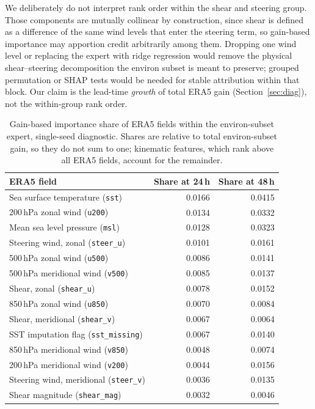 \documentclass{ametsocv6.1}
\newcommand{\era}{ERA5}
\begin{document}
We deliberately do not interpret rank order within the shear and steering group.
Those components are mutually collinear by construction, since shear is defined as
a difference of the same wind levels that enter the steering term, so gain-based
importance may apportion credit arbitrarily among them. Dropping one wind level or
replacing the expert with ridge regression would remove the physical shear--steering
decomposition the environ subset is meant to preserve; grouped permutation or SHAP
tests would be needed for stable attribution within that block. Our claim is the
lead-time \emph{growth} of total \era{} gain (Section~\ref{sec:diag}), not the
within-group rank order.

\begin{table}[ht]
\centering
\footnotesize
\begin{tabular}{@{}lrr@{}}
\toprule
\era{} field & Share at 24\,h & Share at 48\,h \\
\midrule
Sea surface temperature (\texttt{sst}) & 0.0166 & 0.0415 \\
200\,hPa zonal wind (\texttt{u200})    & 0.0134 & 0.0332 \\
Mean sea level pressure (\texttt{msl}) & 0.0128 & 0.0323 \\
Steering wind, zonal (\texttt{steer\_u}) & 0.0101 & 0.0161 \\
500\,hPa zonal wind (\texttt{u500})    & 0.0086 & 0.0141 \\
500\,hPa meridional wind (\texttt{v500}) & 0.0085 & 0.0137 \\
Shear, zonal (\texttt{shear\_u})       & 0.0078 & 0.0152 \\
850\,hPa zonal wind (\texttt{u850})    & 0.0070 & 0.0084 \\
Shear, meridional (\texttt{shear\_v})  & 0.0067 & 0.0064 \\
SST imputation flag (\texttt{sst\_missing}) & 0.0067 & 0.0140 \\
850\,hPa meridional wind (\texttt{v850}) & 0.0048 & 0.0074 \\
200\,hPa meridional wind (\texttt{v200}) & 0.0044 & 0.0156 \\
Steering wind, meridional (\texttt{steer\_v}) & 0.0036 & 0.0135 \\
Shear magnitude (\texttt{shear\_mag})  & 0.0032 & 0.0046 \\
\bottomrule
\end{tabular}
\caption{Gain-based importance share of \era{} fields within the environ-subset
expert, single-seed diagnostic. Shares are relative to total environ-subset gain,
so they do not sum to one; kinematic features, which rank above all \era{} fields,
account for the remainder.}
\label{tab:fi}
\end{table}
\end{document}
